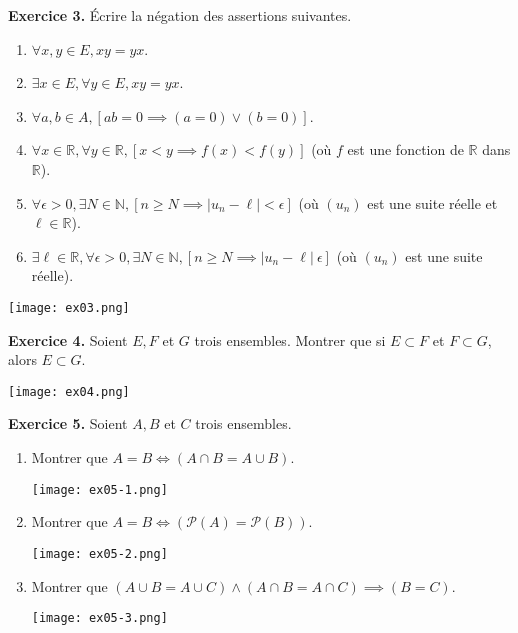 \documentclass[a4paper, 10pt]{report}
\providecommand{\abs}[1]{\lvert#1\rvert}
\begin{document}
	\vspace{5mm}
	\noindent
	\textbf{Exercice 3.} Écrire la négation des assertions suivantes.
	\begin{enumerate}[label=(\roman*)]
		\item $\forall x,y \in E, xy = yx$.
		\item $\exists x \in E, \forall y \in E, xy = yx$.
		\item $\forall a,b \in A, [ab = 0 \implies
			(a = 0) \lor (b = 0)]$.
		\item $\forall x \in \mathbb{R}, \forall y \in \mathbb{R},
			[x < y \implies f(x) < f(y)]$ (où $f$ est une fonction
			de $\mathbb{R}$ dans $\mathbb{R}$).
		\item $\forall \epsilon > 0, \exists N \in \mathbb{N},
			[n \geq N \implies \abs{u_n - \ell} < \epsilon]$
			(où $(u_n)$ est une suite réelle et $\ell \in \mathbb{R}$).
		\item $\exists \ell \in \mathbb{R}, \forall \epsilon > 0,
			\exists N \in \mathbb{N}, [n \geq N \implies
			\abs{u_n - \ell} \ \epsilon]$
			(où $(u_n)$ est une suite réelle).
	\end{enumerate}
	
	\texttt{[image: ex03.png]}
	
	\vspace{5mm}
	\noindent
	\textbf{Exercice 4.} Soient $E, F$ et $G$ trois ensembles. Montrer
	que	si $E \subset F$ et $F \subset G$, alors $E \subset G$.
	
	\texttt{[image: ex04.png]}
	
	\vspace{5mm}
	\noindent
	\textbf{Exercice 5.} Soient $A, B$ et $C$ trois ensembles.
	\begin{enumerate}[label=(\roman*)]
		\item Montrer que $A = B \iff (A \cap B = A \cup B)$.
		
		\texttt{[image: ex05-1.png]}
		
		\item Montrer que $A = B \iff
			(\mathcal{P}(A) = \mathcal{P}(B))$.
		
		\texttt{[image: ex05-2.png]}
		
		\item Montrer que $(A \cup B = A \cup C) \land
			(A \cap B = A \cap C) \implies (B = C)$.
		
		\texttt{[image: ex05-3.png]}
		
	\end{enumerate}
	
\end{document}
